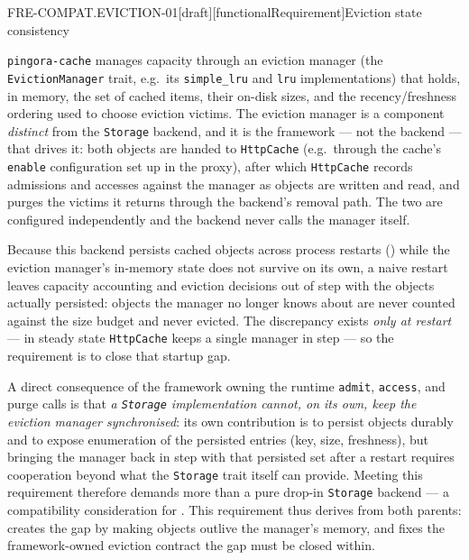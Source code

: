 \begin{requirement}{FRE-COMPAT.EVICTION-01}[draft][functionalRequirement]{Eviction state consistency}


  \texttt{pingora-cache} manages capacity through an eviction manager (the
  \texttt{EvictionManager} trait, e.g.\ its \texttt{simple\_lru} and \texttt{lru}
  implementations) that holds, in memory, the set of cached items, their on-disk
  sizes, and the recency/freshness ordering used to choose eviction victims. The
  eviction manager is a component \emph{distinct} from the \texttt{Storage}
  backend, and it is the framework --- not the backend --- that drives it: both
  objects are handed to \texttt{HttpCache} (e.g.\ through the cache's
  \texttt{enable} configuration set up in the proxy), after which
  \texttt{HttpCache} records admissions and accesses against the manager as objects
  are written and read, and purges the victims it returns through the backend's
  removal path. The two are configured independently and the backend never calls
  the manager itself.

  Because this backend persists cached objects across process restarts
  () while the
  eviction manager's in-memory state does not survive on its own, a naive restart
  leaves capacity accounting and eviction decisions out of step with the objects
  actually persisted: objects the manager no longer knows about are never counted
  against the size budget and never evicted. The discrepancy exists \emph{only at
  restart} --- in steady state \texttt{HttpCache} keeps a single manager in step ---
  so the requirement is to close that startup gap.

  A direct consequence of the framework owning the runtime \texttt{admit},
  \texttt{access}, and purge calls is that \emph{a \texttt{Storage}
  implementation cannot, on its own, keep the eviction manager synchronised}:
  its own contribution is to persist objects durably and to expose enumeration
  of the persisted entries (key, size, freshness), but bringing the manager
  back in step with that persisted set after a restart requires cooperation
  beyond what the \texttt{Storage} trait itself can provide. Meeting this requirement therefore demands more than a
  pure drop-in \texttt{Storage} backend --- a compatibility consideration for
  . This requirement thus derives from both
  parents:  creates the gap by making
  objects outlive the manager's memory, and 
  fixes the framework-owned eviction contract the gap must be closed within.


\end{requirement}
